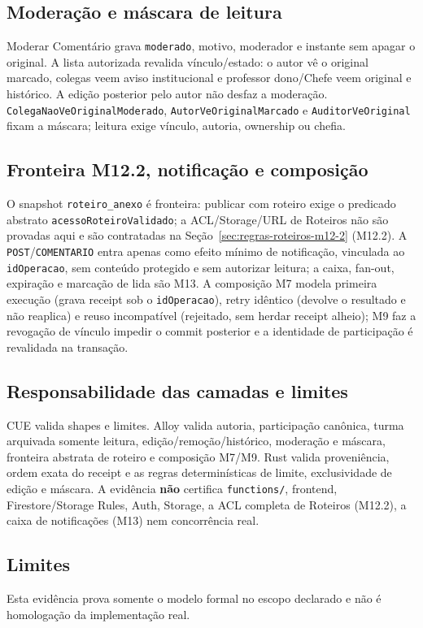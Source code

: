 \subsection*{Moderação e máscara de leitura}
Moderar Comentário grava \texttt{moderado}, motivo, moderador e instante sem
apagar o original. A lista autorizada revalida vínculo/estado: o autor vê o
original marcado, colegas veem aviso institucional e professor dono/Chefe veem
original e histórico. A edição posterior pelo autor não desfaz a moderação.
\texttt{ColegaNaoVeOriginalModerado}, \texttt{AutorVeOriginalMarcado} e
\texttt{AuditorVeOriginal} fixam a máscara; leitura exige vínculo, autoria,
ownership ou chefia.

\subsection*{Fronteira M12.2, notificação e composição}
O snapshot \texttt{roteiro\_anexo} é fronteira: publicar com roteiro exige o
predicado abstrato \texttt{acessoRoteiroValidado}; a ACL/Storage/URL de Roteiros
não são provadas aqui e são contratadas na
Seção~\ref{sec:regras-roteiros-m12-2} (M12.2). A \texttt{POST}/\texttt{COMENTARIO} entra apenas como
efeito mínimo de notificação, vinculada ao \texttt{idOperacao}, sem conteúdo
protegido e sem autorizar leitura; a caixa, fan-out, expiração e marcação de
lida são M13. A composição M7 modela primeira execução (grava receipt sob o
\texttt{idOperacao}), retry idêntico (devolve o resultado e não reaplica) e
reuso incompatível (rejeitado, sem herdar receipt alheio); M9 faz a revogação
de vínculo impedir o commit posterior e a identidade de participação é
revalidada na transação.

\subsection*{Responsabilidade das camadas e limites}
CUE valida shapes e limites. Alloy valida autoria, participação canônica,
turma arquivada somente leitura, edição/remoção/histórico, moderação e máscara,
fronteira abstrata de roteiro e composição M7/M9. Rust valida proveniência,
ordem exata do receipt e as regras determinísticas de limite, exclusividade de
edição e máscara. A evidência \textbf{não} certifica \texttt{functions/},
frontend, Firestore/Storage Rules, Auth, Storage, a ACL completa de Roteiros
(M12.2), a caixa de notificações (M13) nem concorrência real.

\begingroup\small\raggedright


\par\endgroup

\subsection*{Limites}
Esta evidência prova somente o modelo formal no escopo declarado e não é
homologação da implementação real.
\fussy
